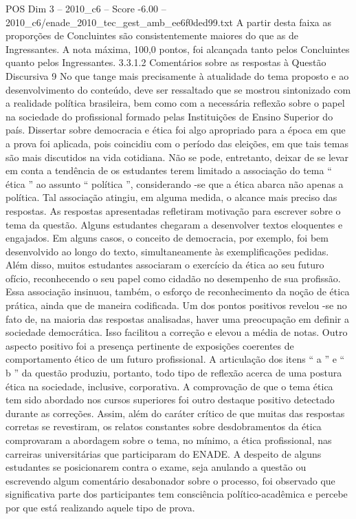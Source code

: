 \begin{textsample}{POS Dim 3 – 2010\_c6 – Score -6.00 – 2010\_c6/enade\_2010\_tec\_gest\_amb\_ee6f0ded99.txt}
A partir desta faixa as proporções de Concluintes são consistentemente maiores do que as de Ingressantes.
A nota máxima, 100,0 pontos, foi alcançada tanto pelos Concluintes quanto pelos Ingressantes. 3.3.1.2 Comentários sobre as respostas à Questão Discursiva 9 No que tange mais precisamente à atualidade do tema proposto e ao desenvolvimento do conteúdo, deve ser ressaltado que se mostrou sintonizado com a realidade política brasileira, bem como com a necessária reflexão sobre o papel na sociedade do profissional formado pelas Instituições de Ensino Superior do país.
Dissertar sobre democracia e ética foi algo apropriado para a época em que a prova foi aplicada, pois coincidiu com o período das eleições, em que tais temas são mais discutidos na vida cotidiana.
Não se pode, entretanto, deixar de se levar em conta a tendência de os estudantes terem limitado a associação do tema “ ética ” ao assunto “ política ”, considerando -se que a ética abarca não apenas a política.
Tal associação atingiu, em alguma medida, o alcance mais preciso das respostas.
As respostas apresentadas refletiram motivação para escrever sobre o tema da questão.
Alguns estudantes chegaram a desenvolver textos eloquentes e engajados.
Em alguns casos, o conceito de democracia, por exemplo, foi bem desenvolvido ao longo do texto, simultaneamente às exemplificações pedidas.
Além disso, muitos estudantes associaram o exercício da ética ao seu futuro ofício, reconhecendo o seu papel como cidadão no desempenho de sua profissão.
Essa associação insinuou, também, o esforço de reconhecimento da noção de ética prática, ainda que de maneira codificada.
Um dos pontos positivos revelou -se no fato de, na maioria das respostas analisadas, haver uma preocupação em definir a sociedade democrática.
Isso facilitou a correção e elevou a média de notas.
Outro aspecto positivo foi a presença pertinente de exposições coerentes de comportamento ético de um futuro profissional.
A articulação dos itens “ a ” e “ b ” da questão produziu, portanto, todo tipo de reflexão acerca de uma postura ética na sociedade, inclusive, corporativa.
A comprovação de que o tema ética tem sido abordado nos cursos superiores foi outro destaque positivo detectado durante as correções.
Assim, além do caráter crítico de que muitas das respostas corretas se revestiram, os relatos constantes sobre desdobramentos da ética comprovaram a abordagem sobre o tema, no mínimo, a ética profissional, nas carreiras universitárias que participaram do ENADE.
A despeito de alguns estudantes se posicionarem contra o exame, seja anulando a questão ou escrevendo algum comentário desabonador sobre o processo, foi observado que significativa parte dos participantes tem consciência político-acadêmica e percebe por que está realizando aquele tipo de prova.

\end{textsample}
